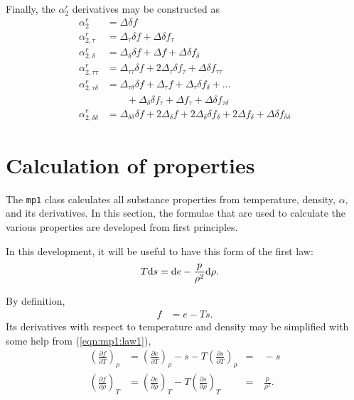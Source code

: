 Finally, the $\alpha_2^r$ derivatives may be constructed as
\begin{subequations}
\begin{align}
\alpha^r_2 &= \Delta \delta f\\
\alpha^r_{2,\tau} &= \Delta_\tau \delta f + \Delta \delta f_\tau\\
\alpha^r_{2,\delta} &= \Delta_\delta \delta f + \Delta f + \Delta \delta f_\delta\\
\alpha^r_{2,\tau\tau} &= \Delta_{\tau\tau} \delta f + 2 \Delta_\tau \delta f_\tau + \Delta \delta f_{\tau\tau}\\
\alpha^r_{2,\tau\delta} &= \Delta_{\tau\delta} \delta f + \Delta_{\tau} f + \Delta_\tau \delta f_\delta + \ldots \nonumber\\
 &\hspace{2em} + \Delta_\delta \delta f_\tau+ \Delta f_\tau + \Delta \delta f_{\tau\delta}\\
\alpha^r_{2,\delta\delta} &= \Delta_{\delta\delta} \delta f + 2\Delta_\delta f + 2\Delta_\delta \delta f_\delta + 2\Delta f_\delta + \Delta \delta f_{\delta\delta}
\end{align}
\end{subequations}

\section{Calculation of properties}\label{sec:mp1:properties}

The \texttt{mp1} class calculates all substance properties from temperature, density, $\alpha$, and its derivatives.  In this section, the formulae that are used to calculate the various properties are developed from first principles.

In this development, it will be useful to have this form of the first law:
\begin{align}
T\mathrm{d} s &= \mathrm{d} e - \frac{p}{\rho^2} \mathrm{d} \rho\label{eqn:mp1:law1}.
\end{align}

By definition,
\begin{align}
f &= e - Ts \label{eqn:mp1:f}.
\end{align}
Its derivatives with respect to temperature and density may be simplified with some help from (\ref{eqn:mp1:law1}),
\begin{align}
\left(\frac{\partial f}{\partial T}\right)_\rho &= \left(\frac{\partial e}{\partial T}\right)_\rho - s - T \left(\frac{\partial s}{\partial T}\right)_\rho &=& \ -s\label{eqn:mp1:ft}\\
\left(\frac{\partial f}{\partial \rho}\right)_T &= \left(\frac{\partial e}{\partial \rho}\right)_T - T \left(\frac{\partial s}{\partial \rho}\right)_T &=& \ \frac{p}{\rho^2} \label{eqn:mp1:fd}.
\end{align}

